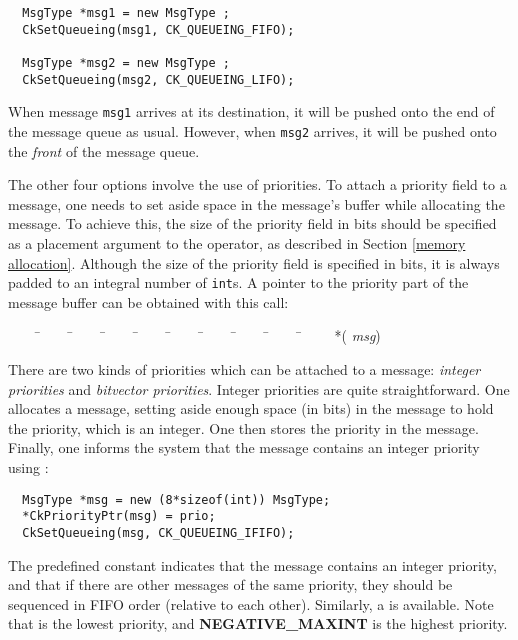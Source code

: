 \begin{verbatim}
  MsgType *msg1 = new MsgType ;
  CkSetQueueing(msg1, CK_QUEUEING_FIFO);

  MsgType *msg2 = new MsgType ;
  CkSetQueueing(msg2, CK_QUEUEING_LIFO);
\end{verbatim}

When message {\tt msg1} arrives at its destination, it will be pushed
onto the end of the message queue as usual.  However, when {\tt msg2}
arrives, it will be pushed onto the {\it front} of the message queue.

The other four options involve the use of
priorities.  To attach a priority field to a
message, one needs to set aside space in the message's buffer while
allocating the message.  To achieve this, the
size of the priority field in bits should be
specified as a placement argument to the  operator, as
described in Section \ref{memory allocation}.  Although the size of
the priority field is specified in bits, it is always padded to an
integral number of {\tt int}s.  A pointer to the priority part of the
message buffer can be obtained with this call:

\begin{tabbing}
~~~~ \=~~~~ \=~~~~ \=~~~~ \=~~~~ \=~~~~ \=~~~~ \=~~~~ \=~~~~ \=~~~~ \kill
\>  *( {\it msg}) \\
\end{tabbing}

There are two kinds of priorities which can be attached to a message:
{\sl integer priorities} and {\sl bitvector
priorities}.  Integer priorities are quite
straightforward.  One allocates a message, setting aside enough space
(in bits) in the message to hold the priority, which is an integer.
One then stores the priority in the message.  Finally, one informs the
system that the message contains an integer priority using
:

\begin{verbatim}
  MsgType *msg = new (8*sizeof(int)) MsgType;
  *CkPriorityPtr(msg) = prio;
  CkSetQueueing(msg, CK_QUEUEING_IFIFO);
\end{verbatim}

The predefined constant   indicates that the
message contains an integer priority, and that if there are other
messages of the same priority, they should be sequenced in FIFO order
(relative to each other).  Similarly, a   is
available.  Note that   is the lowest priority, and {\bf
NEGATIVE\_MAXINT} is the highest priority.


